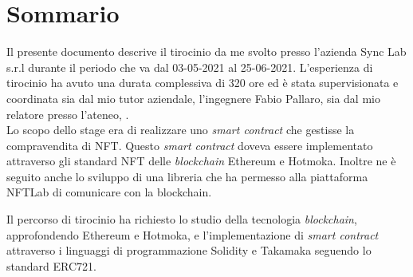 
\cleardoublepage
{}
{}
\begingroup
\let\clearpage\relax
\let\cleardoublepage\relax
\let\cleardoublepage\relax

\chapter*{Sommario}

Il presente documento descrive il tirocinio da me svolto presso l'azienda Sync Lab s.r.l durante il periodo che va dal 03-05-2021 al 25-06-2021.
L'esperienza di tirocinio ha avuto una durata complessiva di 320 ore ed è stata supervisionata e coordinata sia dal mio tutor aziendale, l'ingegnere Fabio Pallaro, sia dal mio relatore presso l'ateneo, \profTitle{} \myProf. \\

\noindent Lo scopo dello stage era di realizzare uno \textit{smart contract} che gestisse la compravendita di NFT. Questo \textit{smart contract} doveva essere implementato attraverso gli standard NFT delle \textit{blockchain} Ethereum e Hotmoka. Inoltre ne è seguito anche lo sviluppo di una libreria che ha permesso alla piattaforma NFTLab di comunicare con la blockchain.

\noindent Il percorso di tirocinio ha richiesto lo studio della tecnologia \textit{blockchain}, approfondendo Ethereum e Hotmoka, e l'implementazione di \textit{smart contract} attraverso i linguaggi di programmazione Solidity e Takamaka seguendo lo standard ERC721. \\

